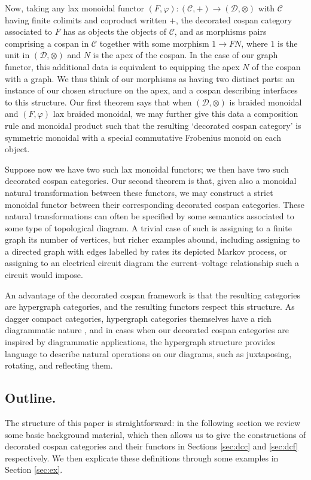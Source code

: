 Now, taking any lax monoidal functor $(F,\varphi)\colon  (\mathcal C,+) \to (\mathcal
D,\otimes)$ with $\mathcal C$ having finite colimits and coproduct written $+$,
the decorated cospan category associated to $F$ has as objects the objects of
$\mathcal C$, and as morphisms pairs comprising a cospan in $\mathcal C$
together with some morphism $1 \to FN$, where $1$ is the unit in $(\mathcal
D,\otimes)$ and $N$ is the apex of the cospan. In the case of our graph
functor, this additional data is equivalent to equipping the apex $N$ of the
cospan with a graph. We thus think of our morphisms as having two distinct
parts: an instance of our chosen structure on the apex, and a cospan describing
interfaces to this structure. Our first theorem says that when $(\mathcal
D,\otimes)$ is braided monoidal and $(F,\varphi)$ lax braided monoidal, we may
further give this data a composition rule and monoidal product such that the
resulting `decorated cospan category' is symmetric monoidal with a special
commutative Frobenius monoid on each object.  

Suppose now we have two such lax monoidal functors; we then have two such
decorated cospan categories. Our second theorem is that, given also a monoidal
natural transformation between these functors, we may construct a strict
monoidal functor between their corresponding decorated cospan categories.  These
natural transformations can often be specified by some semantics associated to
some type of topological diagram. A trivial case of such is assigning to a
finite graph its number of vertices, but richer examples abound, including
assigning to a directed graph with edges labelled by rates its depicted Markov
process, or assigning to an electrical circuit diagram the current--voltage
relationship such a circuit would impose.

An advantage of the decorated cospan framework is that the resulting categories
are hypergraph categories, and the resulting functors respect this structure.
As dagger compact categories, hypergraph categories themselves have a rich
diagrammatic nature \cite{Se}, and in cases when our decorated cospan categories
are inspired by diagrammatic applications, the hypergraph structure provides
language to describe natural operations on our diagrams, such as juxtaposing,
rotating, and reflecting them.

\subsection{Outline.}
The structure of this paper is straightforward: in the following section we
review some basic background material, which then allows us to give the
constructions of decorated cospan categories and their functors in Sections
\ref{sec:dcc} and \ref{sec:dcf} respectively. We then explicate these
definitions through some examples in Section \ref{sec:ex}. 

